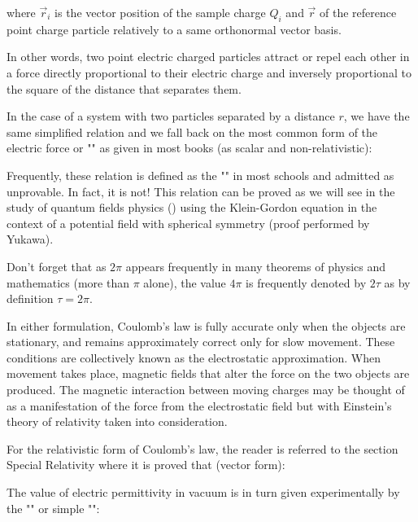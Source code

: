 	where $\vec{r}_i$ is the vector position of the sample charge $Q_i$ and $\vec{r}$ of the reference point charge particle relatively to a same orthonormal vector basis.
	
	In other words, two point electric charged particles attract or repel each other in a force directly proportional to their electric charge and inversely proportional to the square of the distance that separates them.
	
	In the case of a system with two particles separated by a distance $r$, we have the same simplified relation and we fall back on the most common form of the electric force or "" as given in most books (as scalar and non-relativistic):
	
	Frequently, these relation is defined as the "" in most schools and admitted as unprovable. In fact, it is not! This relation can be proved as we will see in the study of quantum fields physics () using the Klein-Gordon equation in the context of a potential field with spherical symmetry (proof performed by Yukawa).
	
	\begin{tcolorbox}[title=Remark,colframe=black,arc=10pt]
	Don't forget that as $2\pi$ appears frequently in many theorems of physics and mathematics (more than $\pi$ alone), the value $4\pi$ is frequently denoted by $2\tau$ as by definition $\tau=2\pi$.
	\end{tcolorbox}
	In either formulation, Coulomb's law is fully accurate only when the objects are stationary, and remains approximately correct only for slow movement. These conditions are collectively known as the electrostatic approximation. When movement takes place, magnetic fields that alter the force on the two objects are produced. The magnetic interaction between moving charges may be thought of as a manifestation of the force from the electrostatic field but with Einstein's theory of relativity taken into consideration.
	\begin{tcolorbox}[title=Remark,colframe=black,arc=10pt]
	For the relativistic form of Coulomb's law, the reader is referred to the section Special Relativity where it is proved that (vector form):
	
	\end{tcolorbox}
	The value of electric permittivity in vacuum is in turn given experimentally by the "" or simple "":
	
